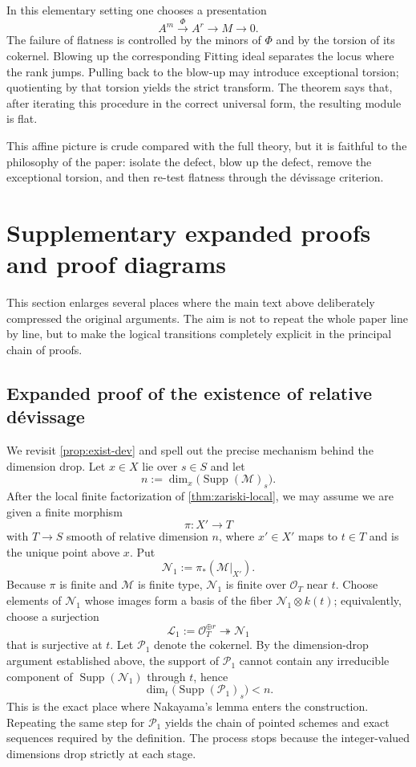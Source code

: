 \documentclass[11pt,oneside]{article}
\newcommand{\Lcal}{\mathcal L}
\newcommand{\M}{\mathcal M}
\newcommand{\N}{\mathcal N}
\newcommand{\Pcal}{\mathcal P}
\newcommand{\OO}{\mathcal O}
\newcommand{\Supp}{\operatorname{Supp}}
\begin{document}
In this elementary setting one chooses a presentation
\[
A^m\xrightarrow{\Phi} A^r\to M\to 0.
\]
The failure of flatness is controlled by the minors of $\Phi$ and by the torsion of its cokernel.  Blowing up the corresponding Fitting ideal separates the locus where the rank jumps.  Pulling back to the blow-up may introduce exceptional torsion; quotienting by that torsion yields the strict transform.  The theorem says that, after iterating this procedure in the correct universal form, the resulting module is flat.

This affine picture is crude compared with the full theory, but it is faithful to the philosophy of the paper: isolate the defect, blow up the defect, remove the exceptional torsion, and then re-test flatness through the d\'evissage criterion.


\section{Supplementary expanded proofs and proof diagrams}

This section enlarges several places where the main text above deliberately compressed the original arguments.  The aim is not to repeat the whole paper line by line, but to make the logical transitions completely explicit in the principal chain of proofs.

\subsection{Expanded proof of the existence of relative d\'evissage}

We revisit \cref{prop:exist-dev} and spell out the precise mechanism behind the dimension drop.  Let $x\in X$ lie over $s\in S$ and let
\[
n:=\dim_x\bigl(\Supp(\M)_s\bigr).
\]
After the local finite factorization of \cref{thm:zariski-local}, we may assume we are given a finite morphism
\[
\pi\colon X'\to T
\]
with $T\to S$ smooth of relative dimension $n$, where $x'\in X'$ maps to $t\in T$ and is the unique point above $x$.  Put
\[
\N_1:=\pi_*(\M|_{X'}).
\]
Because $\pi$ is finite and $\M$ is finite type, $\N_1$ is finite over $\OO_T$ near $t$.  Choose elements of $\N_1$ whose images form a basis of the fiber $\N_1\otimes k(t)$; equivalently, choose a surjection
\[
\Lcal_1:=\OO_T^{\oplus r}\twoheadrightarrow \N_1
\]
that is surjective at $t$.  Let $\Pcal_1$ denote the cokernel.  By the dimension-drop argument established above, the support of $\Pcal_1$ cannot contain any irreducible component of $\Supp(\N_1)$ through $t$, hence
\[
\dim_t\bigl(\Supp(\Pcal_1)_s\bigr)<n.
\]
This is the exact place where Nakayama's lemma enters the construction.  Repeating the same step for $\Pcal_1$ yields the chain of pointed schemes and exact sequences required by the definition.  The process stops because the integer-valued dimensions drop strictly at each stage.
\end{document}
